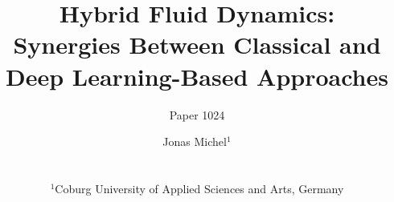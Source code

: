 \documentclass{download/egPublStyle-cgf/egpubl}
\author[Paper 1024]{\parbox{\textwidth}{\centering Paper 1024}}
\author[Michel]
    {\parbox{\textwidth}{\centering 
            Jonas Michel$^1$
            }
            \\
            {
                \parbox{\textwidth}
                {
                    \centering $^1$Coburg University of Applied Sciences and Arts, Germany
                }
            }
    }
\title[Hybrid Fluid Simulation]{Hybrid Fluid Dynamics:\\Synergies Between Classical and Deep Learning-Based Approaches}
\begin{document}
\teaser
{
    
}
\maketitle
\begin{abstract}


\printccsdesc 
\end{abstract}

 


\end{document}
